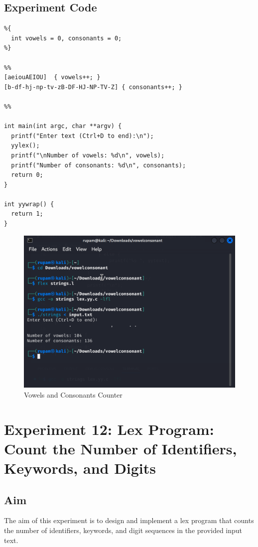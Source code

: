 \documentclass[12pt]{article}
\begin{document}
\subsection*{Experiment Code}
\begin{lstlisting}
%{
  int vowels = 0, consonants = 0;
%}

%%
[aeiouAEIOU]  { vowels++; }
[b-df-hj-np-tv-zB-DF-HJ-NP-TV-Z] { consonants++; }

%%

int main(int argc, char **argv) {
  printf("Enter text (Ctrl+D to end):\n");
  yylex();
  printf("\nNumber of vowels: %d\n", vowels);
  printf("Number of consonants: %d\n", consonants);
  return 0;
}

int yywrap() {
  return 1;
}
\end{lstlisting}
\begin{figure}[H]
    \centering
    \includegraphics[width=1\linewidth]{exp11output.png}
    \caption{Vowels and Consonants Counter}
\end{figure}

\newpage
\section*{Experiment 12: Lex Program: Count the Number of Identifiers, Keywords, and Digits}

\subsection*{Aim}
The aim of this experiment is to design and implement a lex program that counts the number of identifiers, keywords, and digit sequences in the provided input text.
\end{document}
